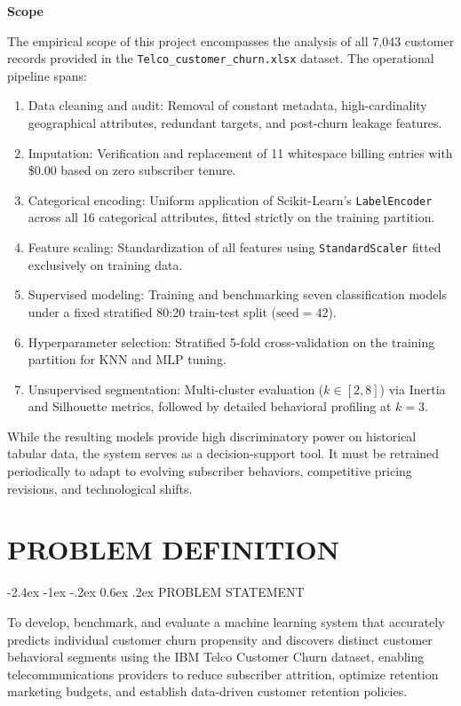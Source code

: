\documentclass[12pt,oneside]{report}
\makeatletter
\renewcommand{\section}{\@startsection{section}{1}{\z@}%
  {-2.4ex \@plus -1ex \@minus -.2ex}%
  {0.6ex \@plus .2ex}%
  {\normalfont\large\bfseries}}
\newcommand{\chapterpage}[1]{\chapter{#1}}
\makeatother
\begin{document}
\textbf{Scope}

The empirical scope of this project encompasses the analysis of all 7,043 customer records provided in the \texttt{Telco\_customer\_churn.xlsx} dataset. The operational pipeline spans:
\begin{enumerate}
    \item Data cleaning and audit: Removal of constant metadata, high-cardinality geographical attributes, redundant targets, and post-churn leakage features.
    \item Imputation: Verification and replacement of 11 whitespace billing entries with \$0.00 based on zero subscriber tenure.
    \item Categorical encoding: Uniform application of Scikit-Learn's \texttt{LabelEncoder} across all 16 categorical attributes, fitted strictly on the training partition.
    \item Feature scaling: Standardization of all features using \texttt{StandardScaler} fitted exclusively on training data.
    \item Supervised modeling: Training and benchmarking seven classification models under a fixed stratified 80:20 train-test split ($\text{seed}=42$).
    \item Hyperparameter selection: Stratified 5-fold cross-validation on the training partition for KNN and MLP tuning.
    \item Unsupervised segmentation: Multi-cluster evaluation ($k \in [2, 8]$) via Inertia and Silhouette metrics, followed by detailed behavioral profiling at $k=3$.
\end{enumerate}

While the resulting models provide high discriminatory power on historical tabular data, the system serves as a decision-support tool. It must be retrained periodically to adapt to evolving subscriber behaviors, competitive pricing revisions, and technological shifts.

\clearpage

\chapterpage{PROBLEM DEFINITION}
\section{PROBLEM STATEMENT}

To develop, benchmark, and evaluate a machine learning system that accurately predicts individual customer churn propensity and discovers distinct customer behavioral segments using the IBM Telco Customer Churn dataset, enabling telecommunications providers to reduce subscriber attrition, optimize retention marketing budgets, and establish data-driven customer retention policies.
\end{document}
